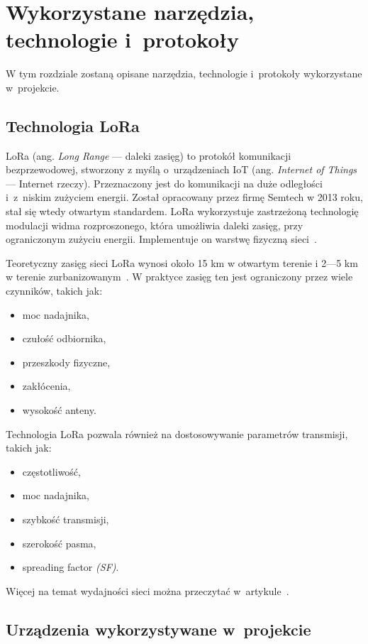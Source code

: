 
\chapter{Wykorzystane narzędzia, technologie i~protokoły}
W tym rozdziale zostaną opisane narzędzia, technologie i~protokoły wykorzystane w~projekcie.
\section{Technologia LoRa}
LoRa (ang. \emph{Long Range} — daleki zasięg) to protokół komunikacji bezprzewodowej, stworzony z myślą o~urządzeniach IoT (ang. \emph{Internet of Things} — Internet rzeczy).
Przeznaczony jest do komunikacji na duże odległości i~z~niskim zużyciem energii.
Został opracowany przez firmę Semtech w 2013 roku, stał się wtedy otwartym standardem.
LoRa wykorzystuje zastrzeżoną technologię modulacji widma rozproszonego, która umożliwia daleki zasięg, przy ograniczonym zużyciu energii.
Implementuje on warstwę fizyczną sieci~\cite{lora:about}.

Teoretyczny zasięg sieci LoRa wynosi około 15 km w otwartym terenie i 2—5 km w terenie zurbanizowanym~\cite{bib:lora-performance}.
W praktyce zasięg ten jest ograniczony przez wiele czynników, takich jak:
\begin{itemize}
    \item moc nadajnika,
    \item czułość odbiornika,
    \item przeszkody fizyczne,
    \item zakłócenia,
    \item wysokość anteny.
\end{itemize}

Technologia LoRa pozwala również na dostosowywanie parametrów transmisji, takich jak:
\begin{itemize}
    \item częstotliwość,
    \item moc nadajnika,
    \item szybkość transmisji,
    \item szerokość pasma,
    \item spreading factor \emph{(SF)}.
\end{itemize}
Więcej na temat wydajności sieci można przeczytać w~artykule~\cite{bib:lora-performance}.

\section{Urządzenia wykorzystywane w~projekcie}

